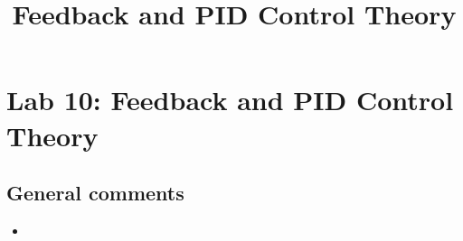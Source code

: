 \documentclass{article}
\title{Feedback and PID Control Theory}
\begin{document}
\maketitle

\section{Lab 10: Feedback and PID Control Theory}

\subsection*{General comments}

\begin{itemize}
\item
\end{itemize}
\end{document}
